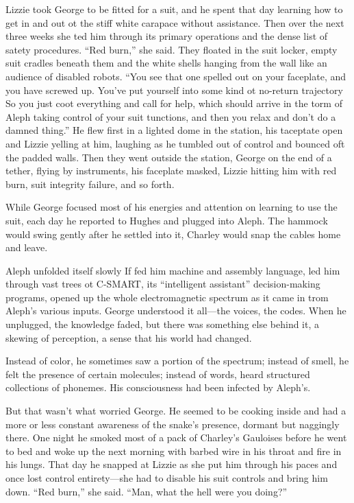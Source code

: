 Lizzie took George to be fitted for a suit, and he spent that day learning how to get in and out ot the stiff white carapace without assistance. Then over the next three weeks she ted him through its primary operations and the dense list of satety procedures.
“Red burn,” she said. They floated in the suit locker, empty suit cradles beneath them and the white shells hanging from the wall like an audience of disabled robots. “You see that one spelled out on your faceplate, and you have screwed up. You’ve put yourself into some kind ot no-return trajectory So you just coot everything and call for help, which should arrive in the torm of Aleph taking control of your suit tunctions, and then you relax and don’t do a damned thing.”
He flew first in a lighted dome in the station, his taceptate open and Lizzie yelling at him, laughing as he tumbled out of control and bounced oft the padded walls. Then they went outside the station, George on the end of a tether, flying by instruments, his faceplate masked, Lizzie hitting him with red burn, suit integrity failure, and so forth.

While George focused most of his energies and attention on learning to use the suit, each day he reported to Hughes and plugged into Aleph. The hammock would swing gently after he settled into it, Charley would snap the cables home and leave.

Aleph unfolded itself slowly If fed him machine and assembly language, led him through vast trees ot C-SMART, its “intelligent assistant” decision-making programs, opened up the whole electromagnetic spectrum as it came in trom Aleph’s various inputs. George understood it all—the voices, the codes. When he unplugged, the knowledge faded, but there was something else behind it, a skewing of perception, a sense that his world had changed.

Instead of color, he sometimes saw a portion of the spectrum; instead of smell, he felt the presence of certain molecules; instead of words, heard structured collections of phonemes. His consciousness had been infected by Aleph’s.

But that wasn’t what worried George. He seemed to be cooking inside and had a more or less constant awareness of the snake’s presence, dormant but naggingly there. One night he smoked most of a pack of Charley’s Gauloises before he went to bed and woke up the next morning with barbed wire in his throat and fire in his lungs. That day he snapped at Lizzie as she put him through his paces and once lost control entirety—she had to disable his suit controls and bring him down. “Red burn,” she said. “Man, what the hell were you doing?”


